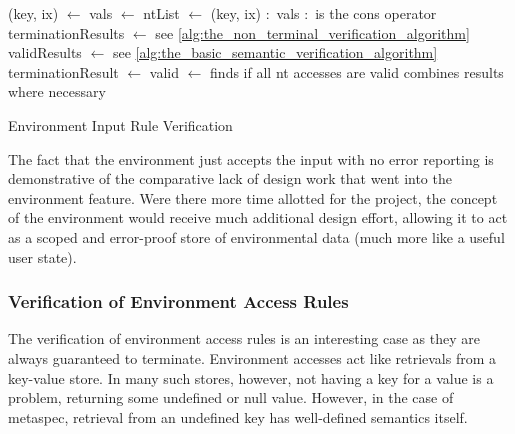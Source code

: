 \begin{algorithm}
\begin{algorithmic}
    \State (key, ix) $\gets$ 
    \State vals $\gets$ 
    \State ntList $\gets$ (key, ix) $:$ vals
    \Comment $:$ is the cons operator
    \State terminationResults $\gets$ 
    \Comment see \autoref{alg:the_non_terminal_verification_algorithm}
    \State validResults $\gets$ 
    \Comment see \autoref{alg:the_basic_semantic_verification_algorithm}
    \State terminationResult $\gets$ 
    \State valid $\gets$ 
    \Comment finds if all nt accesses are valid
    \State
        \State {}
    \Else
        \State {}
    \EndIf
    \Comment combines results where necessary
\EndFunction
\end{algorithmic}
\caption{Environment Input Rule Verification}
\label{alg:environment_input_rule_verification}
\end{algorithm}

The fact that the environment just accepts the input with no error reporting is demonstrative of the comparative lack of design work that went into the environment feature. 
Were there more time allotted for the project, the concept of the environment would receive much additional design effort, allowing it to act as a scoped and error-proof store of environmental data (much more like a useful user state). 


\subsubsection{Verification of Environment Access Rules} %
\label{ssub:verification_of_environment_access_rules}
The verification of environment access rules is an interesting case as they are always guaranteed to terminate. 
Environment accesses act like retrievals from a key-value store.
In many such stores, however, not having a key for a value is a problem, returning some undefined or null value.
However, in the case of \gls{metaspec}, retrieval from an undefined key has well-defined semantics itself.\\

